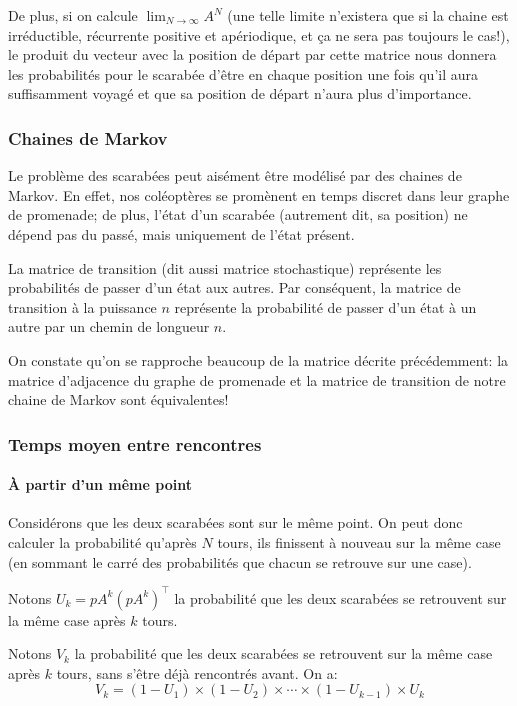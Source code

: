   De plus, si on calcule $\lim_{N \to \infty} A^N$ (une telle limite n'existera
  que si la chaine est irréductible, récurrente positive et apériodique, et ça
  ne sera pas toujours le cas!), le produit du vecteur avec la position de
  départ par cette matrice nous donnera les probabilités pour le scarabée
  d'être en chaque position une fois qu'il aura suffisamment voyagé et que sa
  position de départ n'aura plus d'importance.

  \subsubsection{Chaines de Markov}
    Le problème des scarabées peut aisément être modélisé par des chaines de
    Markov. En effet, nos coléoptères se promènent en temps discret dans leur
    graphe de promenade; de plus, l'état d'un scarabée (autrement dit, sa
    position) ne dépend pas du passé, mais uniquement de l'état présent.

    La matrice de transition (dit aussi matrice stochastique) représente les
    probabilités de passer d'un état aux autres. Par conséquent, la matrice de
    transition à la puissance $n$ représente la probabilité de passer d'un état
    à un autre par un chemin de longueur $n$.

    On constate qu'on se rapproche beaucoup de la matrice décrite précédemment:
    la matrice d'adjacence du graphe de promenade et la matrice de transition
    de notre chaine de Markov sont équivalentes!

  \subsubsection{Temps moyen entre rencontres}
    \paragraph{À partir d'un même point}
      Considérons que les deux scarabées sont sur le même point. On peut donc
      calculer la probabilité qu'après $N$ tours, ils finissent à nouveau sur
      la même case (en sommant le carré des probabilités que chacun se retrouve
      sur une case).

      Notons $U_k = pA^k(pA^k)^\intercal$ la probabilité que les deux scarabées
      se retrouvent sur la même case après $k$ tours.

      Notons $V_k$ la probabilité que les deux scarabées se retrouvent sur la
      même case après $k$ tours, sans s'être déjà rencontrés avant. On a:
        \[V_k = (1 - U_1) \times (1 - U_2) \times \cdots \times (1 - U_{k - 1})
        \times U_k\]

